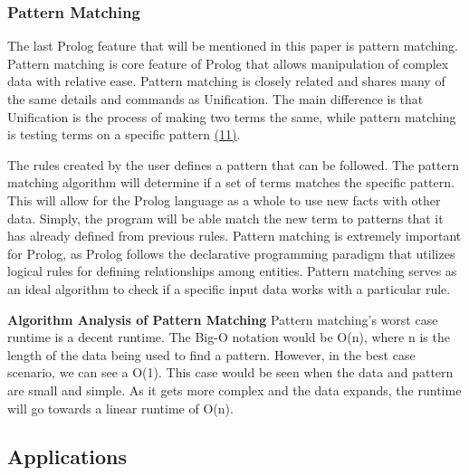 \documentclass{article}
\theoremstyle{theorem}
\theoremstyle{definition}
\theoremstyle{remark}
\begin{document}
\subsubsection{Pattern Matching}
\noindent\newline The last Prolog feature that will be mentioned in this paper is pattern matching. Pattern matching is core feature of Prolog that allows manipulation of complex data with relative ease. Pattern matching is closely related and shares many of the same details and commands as Unification. The main difference is that Unification is the process of making two terms the same, while pattern matching is testing terms on a specific pattern \href{https://composingprograms.com/pages/45-unification.html}{(11)}. 

\noindent\newline The rules created by the user defines a pattern that can be followed. The pattern matching algorithm will determine if a set of terms matches the specific pattern. This will allow for the Prolog language as a whole to use new facts with other data. Simply, the program will be able match the new term to patterns that it has already defined from previous rules. Pattern matching is extremely important for Prolog, as Prolog follows the declarative programming paradigm that utilizes logical rules for defining relationships among entities. Pattern matching serves as an ideal algorithm to check if a specific input data works with a particular rule.


\noindent\newline\newline\textbf{Algorithm Analysis of Pattern Matching}
\noindent\newline Pattern matching's worst case runtime is a decent runtime. The Big-O notation would be O(n), where n is the length of the data being used to find a pattern. However, in the best case scenario, we can see a O(1). This case would be seen when the data and pattern are small and simple. As it gets more complex and the data expands, the runtime will go towards a linear runtime of O(n). 


\subsection{Applications}
\end{document}
